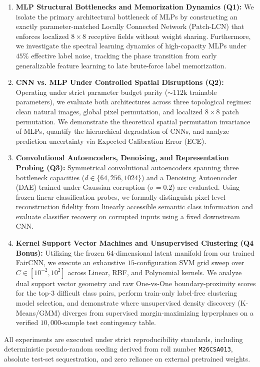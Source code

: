 \begin{enumerate}
    \item \textbf{MLP Structural Bottlenecks and Memorization Dynamics (Q1):} We isolate the primary architectural bottleneck of MLPs by constructing an exactly parameter-matched Locally Connected Network (Patch-LCN) that enforces localized $8 \times 8$ receptive fields without weight sharing. Furthermore, we investigate the spectral learning dynamics of high-capacity MLPs under $45\%$ effective label noise, tracking the phase transition from early generalizable feature learning to late brute-force label memorization.
    \item \textbf{CNN vs. MLP Under Controlled Spatial Disruptions (Q2):} Operating under strict parameter budget parity ($\sim 112\text{k}$ trainable parameters), we evaluate both architectures across three topological regimes: clean natural images, global pixel permutation, and localized $8 \times 8$ patch permutation. We demonstrate the theoretical spatial permutation invariance of MLPs, quantify the hierarchical degradation of CNNs, and analyze prediction uncertainty via Expected Calibration Error (ECE).
    \item \textbf{Convolutional Autoencoders, Denoising, and Representation Probing (Q3):} Symmetrical convolutional autoencoders spanning three bottleneck capacities ($d \in \{64, 256, 1024\}$) and a Denoising Autoencoder (DAE) trained under Gaussian corruption ($\sigma=0.2$) are evaluated. Using frozen linear classification probes, we formally distinguish pixel-level reconstruction fidelity from linearly accessible semantic class information and evaluate classifier recovery on corrupted inputs using a fixed downstream CNN.
    \item \textbf{Kernel Support Vector Machines and Unsupervised Clustering (Q4 Bonus):} Utilizing the frozen 64-dimensional latent manifold from our trained FairCNN, we execute an exhaustive $15$-configuration SVM grid sweep over $C \in [10^{-2}, 10^{2}]$ across Linear, RBF, and Polynomial kernels. We analyze dual support vector geometry and raw One-vs-One boundary-proximity scores for the top-3 difficult class pairs, perform train-only label-free clustering model selection, and demonstrate where unsupervised density discovery (K-Means/GMM) diverges from supervised margin-maximizing hyperplanes on a verified $10{,}000$-sample test contingency table.
\end{enumerate}

All experiments are executed under strict reproducibility standards, including deterministic pseudo-random seeding derived from roll number \texttt{M26CSA013}, absolute test-set sequestration, and zero reliance on external pretrained weights.
